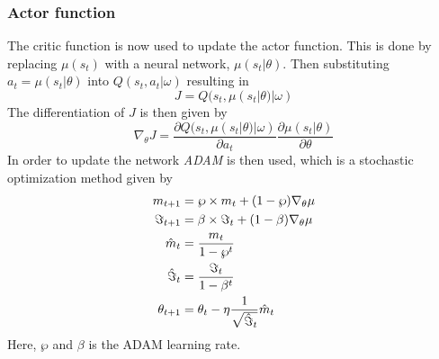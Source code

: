 \subsubsection{Actor function}
The critic function is now used to update the actor function. This is done by replacing $\mu(s_{t})$ with a neural network, $\mu(s_{t}|\theta)$. Then substituting $a_{t}=\mu(s_{t}|\theta)$ into $Q(s_{t},a_{t}|\omega)$ resulting in 
\begin{equation}
    J = Q(s_{t}, \mu(s_{t}|\theta)|\omega)
\end{equation}
The differentiation of $J$ is then given by
\begin{equation}
    \nabla_{\theta}J = \frac{\partial Q(s_{t}, \mu(s_{t}|\theta)|\omega)}{\partial a_{t}}\frac{\partial \mu(s_{t}|\theta)}{\partial\theta}
\end{equation}
In order to update the network \textit{ADAM} \cite{Kingma} is then used, which is a stochastic optimization method given by
\begin{align}
    m_{t+1} & = \wp\times m_{t}+(1-\wp)\nabla_{\theta}\mu \\
    \Im_{t+1} & = \beta\times\Im_{t}+(1-\beta)\nabla_{\theta}\mu \\
    \Hat{m}_{t} & = \frac{m_{t}}{1-\wp^{t}} \\
    \Hat{\Im}_{t} & = \frac{\Im_{t}}{1-\beta^{t}} \\
    \theta_{t+1} & = \theta_{t} - \eta\frac{1}{\sqrt{\Hat{\Im}_{t}}}\Hat{m}_{t}
\end{align}
Here, $\wp$ and $\beta$ is the ADAM learning rate.
